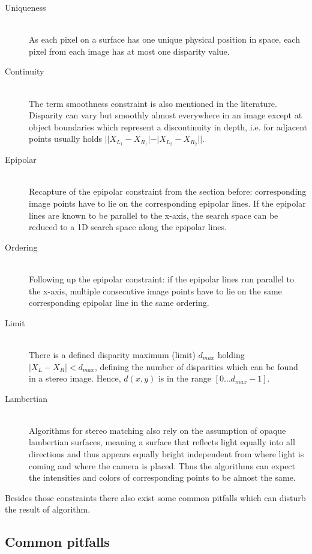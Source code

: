 \begin{description}
  \item[Uniqueness] \hfill \\ As each pixel on a surface has one unique physical position in space, each pixel from each image has at most one disparity value.
  \item[Continuity] \hfill \\ The term smoothness constraint is also mentioned in the literature. Disparity can vary but smoothly almost everywhere in an image except at object boundaries which represent a discontinuity in depth, i.e. for adjacent points usually holds $||X_{L_1} - X_{R_1}| - |X_{L_2} - X_{R_2}||$.
  \item[Epipolar] \hfill \\ Recapture of the epipolar constraint from the section before: corresponding image points have to lie on the corresponding epipolar lines. If the epipolar lines are known to be parallel to the x-axis, the search space can be reduced to a 1D search space along the epipolar lines.
  \item[Ordering] \hfill \\ Following up the epipolar constraint: if the epipolar lines run parallel to the x-axis, multiple consecutive image points have to lie on the same corresponding epipolar line in the same ordering.
  \item[Limit] \hfill \\ There is a defined disparity maximum (limit) $d_{max}$ holding $|X_L - X_R| < d_{max}$, defining the number of disparities which can be found in a stereo image. Hence, $d(x,y)$ is in the range $[0 \dots d_{max} - 1]$.
  \item[Lambertian] \hfill \\ Algorithms for stereo matching also rely on the assumption of opaque lambertian surfaces, meaning a surface that reflects light equally into all directions and thus appears equally bright independent from where light is coming and where the camera is placed. Thus the algorithms can expect the intensities and colors of corresponding points to be almost the same.
\end{description}

\noindent Besides those constraints there also exist some common pitfalls which can disturb the result of algorithm.

\subsection*{Common pitfalls}

